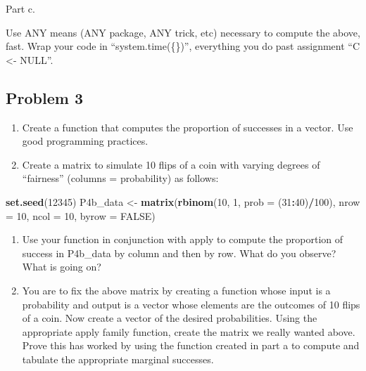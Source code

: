 \documentclass[]{article}
\newenvironment{Shaded}{\begin{snugshade}}{\end{snugshade}}
\newcommand{\DataTypeTok}[1]{\textcolor[rgb]{0.13,0.29,0.53}{#1}}
\newcommand{\DecValTok}[1]{\textcolor[rgb]{0.00,0.00,0.81}{#1}}
\newcommand{\KeywordTok}[1]{\textcolor[rgb]{0.13,0.29,0.53}{\textbf{#1}}}
\newcommand{\NormalTok}[1]{#1}
\newcommand{\OperatorTok}[1]{\textcolor[rgb]{0.81,0.36,0.00}{\textbf{#1}}}
\newcommand{\OtherTok}[1]{\textcolor[rgb]{0.56,0.35,0.01}{#1}}
\newcommand{\StringTok}[1]{\textcolor[rgb]{0.31,0.60,0.02}{#1}}
\begin{document}
Part c.

Use ANY means (ANY package, ANY trick, etc) necessary to compute the
above, fast. Wrap your code in ``system.time(\{\})'', everything you do
past assignment ``C \textless{}- NULL''.

\hypertarget{problem-3-1}{%
\subsection{Problem 3}\label{problem-3-1}}

\begin{enumerate}
\def\labelenumi{\alph{enumi}.}
\item
  Create a function that computes the proportion of successes in a
  vector. Use good programming practices.
\item
  Create a matrix to simulate 10 flips of a coin with varying degrees of
  ``fairness'' (columns = probability) as follows:
\end{enumerate}

\begin{Shaded}
\begin{Highlighting}[]
    \KeywordTok{set.seed}\NormalTok{(}\DecValTok{12345}\NormalTok{)}
\NormalTok{    P4b_data <-}\StringTok{ }\KeywordTok{matrix}\NormalTok{(}\KeywordTok{rbinom}\NormalTok{(}\DecValTok{10}\NormalTok{, }\DecValTok{1}\NormalTok{, }\DataTypeTok{prob =}\NormalTok{ (}\DecValTok{31}\OperatorTok{:}\DecValTok{40}\NormalTok{)}\OperatorTok{/}\DecValTok{100}\NormalTok{), }\DataTypeTok{nrow =} \DecValTok{10}\NormalTok{, }\DataTypeTok{ncol =} \DecValTok{10}\NormalTok{, }\DataTypeTok{byrow =} \OtherTok{FALSE}\NormalTok{)}
\end{Highlighting}
\end{Shaded}

\begin{enumerate}
\def\labelenumi{\alph{enumi}.}
\setcounter{enumi}{2}
\item
  Use your function in conjunction with apply to compute the proportion
  of success in P4b\_data by column and then by row. What do you
  observe? What is going on?
\item
  You are to fix the above matrix by creating a function whose input is
  a probability and output is a vector whose elements are the outcomes
  of 10 flips of a coin. Now create a vector of the desired
  probabilities. Using the appropriate apply family function, create the
  matrix we really wanted above. Prove this has worked by using the
  function created in part a to compute and tabulate the appropriate
  marginal successes.
\end{enumerate}
\end{document}
